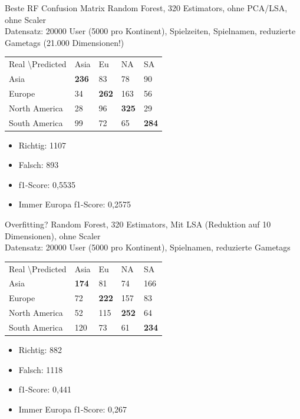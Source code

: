 \documentclass[12pt]{beamer}
\begin{document}
\begin{frame}[fragile]{Beste RF Confusion Matrix}
Random Forest, 320 Estimators, ohne PCA/LSA, ohne Scaler \\
Datensatz: 20000 User (5000 pro Kontinent), Spielzeiten, Spielnamen, reduzierte Gametags (21.000 Dimensionen!)\\
\medskip
\begin{tabular}{| l| l| l| l| l|}
\hline
Real \textbackslash Predicted & Asia & Eu & NA & SA \\
Asia & \textbf{236} & 83 & 78 & 90 \\
Europe & 34 & \textbf{262} & 163 & 56 \\
North America & 28 & 96 & \textbf{325} & 29 \\
South America & 99 & 72 & 65 & \textbf{284} \\
\hline
\end{tabular}
\begin{itemize}
\item Richtig: 1107
\item Falsch: 893
\item f1-Score: 0,5535
\item Immer Europa f1-Score: 0,2575
\end{itemize}
\end{frame}

\begin{frame}[fragile]{Overfitting?}
Random Forest, 320 Estimators, Mit LSA (Reduktion auf 10 Dimensionen), ohne Scaler \\
Datensatz: 20000 User (5000 pro Kontinent), Spielnamen, reduzierte Gametags \\
\medskip
\begin{tabular}{| l| l| l| l| l|}
\hline
Real \textbackslash Predicted & Asia & Eu & NA & SA \\
Asia & \textbf{174} & 81 & 74 & 166 \\
Europe & 72 & \textbf{222} & 157 & 83 \\
North America & 52 & 115 & \textbf{252} & 64 \\
South America & 120 & 73 & 61 & \textbf{234} \\
\hline
\end{tabular}
\begin{itemize}
\item Richtig: 882
\item Falsch: 1118
\item f1-Score: 0,441
\item Immer Europa f1-Score: 0,267
\end{itemize}
\end{frame}
\end{document}
